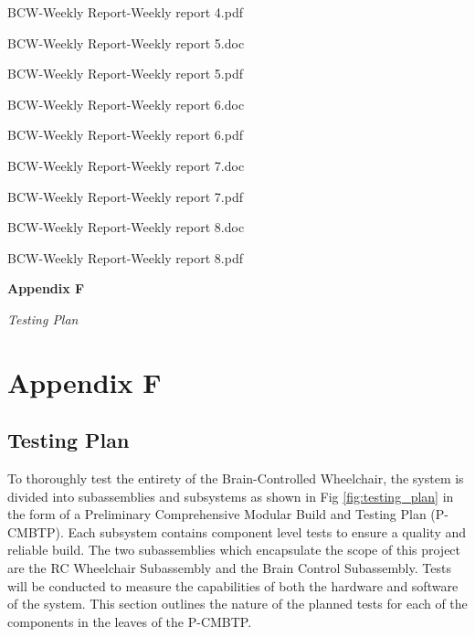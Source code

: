 \documentclass[conference]{IEEEtran}
\begin{document}
                \indent \indent \indent \indent BCW-Weekly Report-Weekly report 4.pdf 
                
                \indent \indent \indent \indent BCW-Weekly Report-Weekly report 5.doc 
                
                \indent \indent \indent \indent BCW-Weekly Report-Weekly report 5.pdf 
                
                \indent \indent \indent \indent BCW-Weekly Report-Weekly report 6.doc 
                
                \indent \indent \indent \indent BCW-Weekly Report-Weekly report 6.pdf 
                
               \indent \indent \indent \indent  BCW-Weekly Report-Weekly report 7.doc 
                
                \indent \indent \indent \indent BCW-Weekly Report-Weekly report 7.pdf 
                
                \indent \indent \indent \indent BCW-Weekly Report-Weekly report 8.doc 
                
               \indent \indent \indent \indent  BCW-Weekly Report-Weekly report 8.pdf 
    

\clearpage
\onecolumn
\begin{center}
    \vspace*{5cm}
     {\Huge\bfseries Appendix F \par}
     \vspace{1cm}
    \textit{Testing Plan} \\
\end{center}
\clearpage
\twocolumn

\setcounter{section}{6}
\renewcommand{\thesubsection}{F.\Alph{subsection}}
\section*{\textbf{Appendix F}}
        \setcounter{figure}{0}
        \renewcommand{\thefigure}{F.\arabic{figure}}
        \setcounter{table}{0}
        \renewcommand{\thetable}{F.\arabic{table}}
        \setcounter{subsection}{0}
        
    \subsection{Testing Plan}
   To thoroughly test the entirety of the Brain-Controlled Wheelchair, the system is divided into subassemblies and subsystems as shown in Fig \ref{fig:testing_plan} in the form of a Preliminary Comprehensive Modular Build and Testing Plan (P-CMBTP). Each subsystem contains component level tests to ensure a quality and reliable build. The two subassemblies which encapsulate the scope of this project are the RC Wheelchair Subassembly and the Brain Control Subassembly. Tests will be conducted to measure the capabilities of both the hardware and software of the system. This section outlines the nature of the planned tests for each of the components in the leaves of the P-CMBTP.  
        
\end{document}
